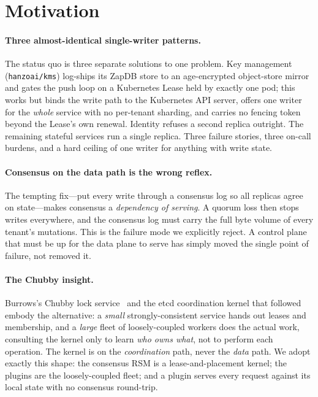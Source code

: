 \documentclass[11pt]{article}
\begin{document}
\section{Motivation}
\label{sec:motivation}

\paragraph{Three almost-identical single-writer patterns.}
The status quo is three separate solutions to one problem. Key management
(\texttt{hanzoai/kms}) log-ships its ZapDB store to an age-encrypted
object-store mirror and gates the push loop on a Kubernetes Lease held by
exactly one pod; this works but binds the write path to the Kubernetes API
server, offers one writer for the \emph{whole} service with no per-tenant
sharding, and carries no fencing token beyond the Lease's own renewal.
Identity refuses a second replica outright. The remaining stateful services
run a single replica. Three failure stories, three on-call burdens, and a
hard ceiling of one writer for anything with write state.

\paragraph{Consensus on the data path is the wrong reflex.}
The tempting fix---put every write through a consensus log so all replicas
agree on state---makes consensus a \emph{dependency of serving}. A quorum
loss then stops writes everywhere, and the consensus log must carry the full
byte volume of every tenant's mutations. This is the failure mode we
explicitly reject. A control plane that must be up for the data plane to
serve has simply moved the single point of failure, not removed it.

\paragraph{The Chubby insight.}
Burrows's Chubby lock service~\cite{chubby} and the etcd coordination kernel
that followed~\cite{etcdraft} embody the alternative: a \emph{small}
strongly-consistent service hands out leases and membership, and a
\emph{large} fleet of loosely-coupled workers does the actual work, consulting
the kernel only to learn \emph{who owns what}, not to perform each operation.
The kernel is on the \emph{coordination} path, never the \emph{data} path.
We adopt exactly this shape: the consensus RSM is a lease-and-placement
kernel; the plugins are the loosely-coupled fleet; and a plugin serves every
request against its local state with no consensus round-trip.
\end{document}

